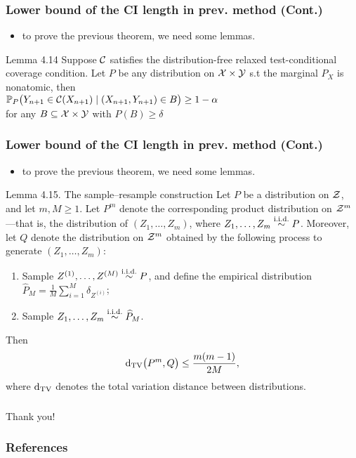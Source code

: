 \documentclass[compress]{beamer}
\begin{document}
\begin{frame}\frametitle{Lower bound of the CI length in prev. method (Cont.)}
	\begin{itemize}
		\item to prove the previous theorem, we need some lemmas.
	\end{itemize}
	\begin{block}{Lemma 4.14}
		\small Suppose $\mathcal{C}$ satisfies the distribution-free relaxed test-conditional coverage condition. Let $P$ be any distribution on $\mathcal{X}\times\mathcal{Y}$ s.t the marginal $P_X$ is nonatomic, then\\
		$\mathbb{P}_P\big(Y_{n+1}\in \mathcal{C}(X_{n+1})\mid (X_{n+1},Y_{n+1})\in B\big) \geq 1-\alpha$\\
		for any $B\subseteq\mathcal{X}\times\mathcal{Y}$ with $P(B)\geq \delta$
	\end{block}
\end{frame}
\begin{frame}\frametitle{Lower bound of the CI length in prev. method (Cont.)}
	\begin{itemize}
		\item to prove the previous theorem, we need some lemmas.
	\end{itemize}
	\begin{block}{Lemma 4.15. The sample–resample construction}
		\small Let $P$ be a distribution on $\mathcal{Z}$, and let $m,M\geq 1$. Let $P^m$ denote the corresponding product distribution on $\mathcal{Z}^m$---that is, the distribution of $(Z_1,\dots,Z_m)$, where $Z_1,\dots,Z_m\stackrel{\textnormal{i.i.d.}}{\sim} P$. Moreover, let $Q$ denote the distribution on $\mathcal{Z}^m$ obtained by the following process to generate $(Z_1,\dots,Z_m)$:
		\begin{enumerate}
			\item Sample $Z^{(1)},\dots,Z^{(M)}\stackrel{\textnormal{i.i.d.}}{\sim} P$, and define the empirical distribution $\widehat{P}_M = \frac{1}{M}\sum_{i=1}^M \delta_{Z^{(i)}}$;
			\item Sample $Z_1,\dots,Z_m\stackrel{\textnormal{i.i.d.}}{\sim} \widehat{P}_M$.
		\end{enumerate}
		Then
		\[\textnormal{d}_{\textnormal{TV}}\big(P^m,Q\big) \leq \frac{m(m-1)}{2M},\]
		where $\textnormal{d}_{\textnormal{TV}}$ denotes the total variation distance between distributions.
	\end{block}
\end{frame}


\begin{frame}\frametitle{}
    \vfill
    \begin{center}
        \begin{Huge}Thank you!\end{Huge}
    \end{center}
    \vfill
\end{frame}

\begin{frame}[t, allowframebreaks]\frametitle{References}
    \nocite{*} %
    
\end{frame}
\end{document}
